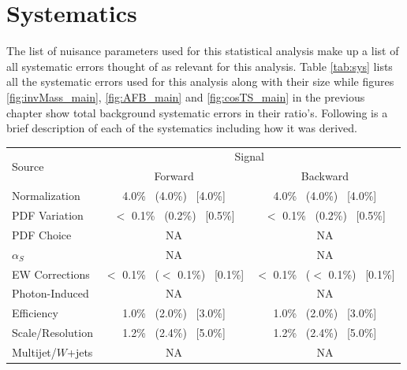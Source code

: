 \section{Systematics}
    \label{sec:sys}

    The list of nuisance parameters used for this statistical analysis make up a list of all systematic errors thought of as relevant for this analysis. Table \ref{tab:sys} lists all the systematic errors used for this analysis along with their size while figures \ref{fig:invMass_main}, \ref{fig:AFB_main} and \ref{fig:cosTS_main} in the previous chapter show total background systematic errors in their ratio's. Following is a brief description of each of the systematics including how it was derived.

    \begin {table}[h]
        \begin{center}
        \begin{tabular}{ | l | c c | } 
            \hline
            \multirow{2}{*}{Source} & \multicolumn{2}{c|}{Signal}                                      \\
                                & Forward                           & Backward                        \\
            \hline
            Normalization       & 4.0\% ~(4.0\%) ~[4.0\%]           & 4.0\% ~(4.0\%) ~[4.0\%]         \\
            PDF Variation       & $<$ 0.1\% ~(0.2\%) ~[0.5\%]       & $<$ 0.1\% ~(0.2\%) ~[0.5\%]     \\
            PDF Choice          & NA                                & NA                              \\
            $\alpha_S$          & NA                                & NA                              \\
            EW Corrections      & $<$ 0.1\% ~($<$ 0.1\%) ~[0.1\%]   & $<$ 0.1\% ~($<$ 0.1\%) ~[0.1\%] \\
            Photon-Induced      & NA                                & NA                              \\
            Efficiency          & 1.0\% ~(2.0\%) ~[3.0\%]           & 1.0\% ~(2.0\%) ~[3.0\%]         \\
            Scale/Resolution    & 1.2\% ~(2.4\%) ~[5.0\%]           & 1.2\% ~(2.4\%) ~[5.0\%]         \\
            Multijet/$W$+jets  & NA                                & NA                              \\

\end{tabular}
\end{center}
\end{table}
